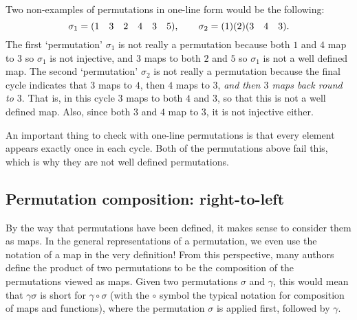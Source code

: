 \begin{example}
    Two non-examples of permutations in one-line form would be the following:
    \[
    \sigma_{1} = (1 \quad 3 \quad 2 \quad 4 \quad 3 \quad 5), \hspace{20pt} \sigma_{2} = (1)(2)(3 \quad 4 \quad 3).
    \]
    The first `permutation' $\sigma_{1}$ is not really a permutation because both $1$ and $4$ map to $3$ so $\sigma_{1}$ is not injective, and $3$ maps to both $2$ and $5$ so $\sigma_{1}$ is not a well defined map. The second `permutation' $\sigma_{2}$ is not really a permutation because the final cycle indicates that $3$ maps to $4$, then $4$ maps to $3$, \textit{and then $3$ maps back round to $3$}. That is, in this cycle $3$ maps to both $4$ and $3$, so that this is not a well defined map. Also, since both $3$ and $4$ map to $3$, it is not injective either.

    An important thing to check with one-line permutations is that every element appears exactly once in each cycle. Both of the permutations above fail this, which is why they are not well defined permutations.
\end{example}


\subsection{Permutation composition: right-to-left}

By the way that permutations have been defined, it makes sense to consider them as maps. In the general representations of a permutation, we even use the notation of a map in the very definition! From this perspective, many authors define the product of two permutations to be the composition of the permutations viewed as maps. Given two permutations $\sigma$ and $\gamma$, this would mean that $\gamma\sigma$ is short for $\gamma \circ \sigma$ (with the $\circ$ symbol the typical notation for composition of maps and functions), where the permutation $\sigma$ is applied first, followed by $\gamma$.


